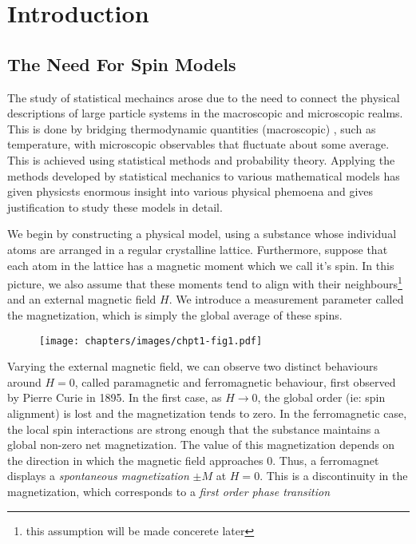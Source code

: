 \chapter{Introduction}
	\section{The Need For Spin Models}
	The study of statistical mechaincs arose due to the need to connect the physical descriptions
	of large particle systems in the macroscopic and microscopic realms. This is done by bridging 
	thermodynamic quantities (macroscopic) , such as temperature, with microscopic
	observables that fluctuate about some average. This is achieved using statistical methods and 
	probability theory. Applying the methods developed by statistical mechanics to various mathematical 
	models has given physicsts enormous insight into various physical phemoena and gives justification 
	to study these models in detail. 

	We begin by constructing a physical model, using a substance whose individual atoms are arranged 
	in a regular crystalline lattice. Furthermore, suppose that each atom in the lattice has a magnetic 
	moment which we call it's spin. In this picture, we also assume that these moments tend to align 
	with their neighbours\footnote{this assumption will be made concerete later} and an external 
	magnetic field $H$. We introduce a measurement parameter called the magnetization, which is simply 
	the global average of these spins.

	\begin{figure}[h]
		\centering
		\def\svgwidth{\columnwidth}
		\texttt{[image: chapters/images/chpt1-fig1.pdf]}
		\caption{}
	\end{figure}


	Varying the external magnetic field, we can observe two distinct behaviours around $H=0$, called
	paramagnetic and ferromagnetic behaviour, first observed by Pierre Curie in 1895. In the first case, 
	as $H \rightarrow 0$, the global order (ie: spin alignment) is lost and the magnetization tends to 
	zero. In the ferromagnetic case, the local spin interactions are strong enough that the substance 
	maintains a global non-zero net magnetization. The value of this magnetization depends on the 
	direction in which the magnetic field approaches $0$. Thus, a ferromagnet displays 
	a \textit{spontaneous magnetization} $\pm M$ at $H=0$. This is a discontinuity in the magnetization,
	which corresponds to a \textit{first order phase transition}

